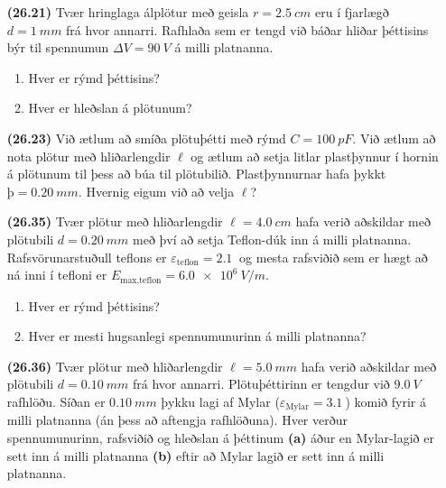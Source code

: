 \begin{enumerate}[label = \textbf{(\alph*)}]

\item[\textbf{(26.21)}] Tvær hringlaga álplötur með geisla $r = \SI{2.5}{cm}$ eru í fjarlægð $d = \SI{1}{mm}$ frá hvor annarri. Rafhlaða sem er tengd við báðar hliðar þéttisins býr til spennumun $\Delta V = \SI{90}{V}$ á milli platnanna.

\begin{enumerate}[label = \textbf{(\alph*)}]
    \item Hver er rýmd þéttisins?
    \item Hver er hleðslan á plötunum?
\end{enumerate}

\item[\textbf{(26.23)}] Við ætlum að smíða plötuþétti með rýmd $C = \SI{100}{pF}$. Við ætlum að nota plötur með hliðarlengdir $\ell$ og ætlum að setja litlar plastþynnur í hornin á plötunum til þess að búa til plötubilið. Plastþynnurnar hafa þykkt $þ = \SI{0.20}{mm}$. Hvernig eigum við að velja $\ell$?

\item[\textbf{(26.35)}] Tvær plötur með hliðarlengdir $\ell = \SI{4.0}{cm}$ hafa verið aðskildar með plötubili $d = \SI{0.20}{mm}$ með því að setja Teflon-dúk inn á milli platnanna. Rafsvörunarstuðull teflons er $\varepsilon_{\text{teflon}} = \SI{2.1}{}$ og mesta rafsviðið sem er hægt að ná inni í tefloni er $E_{\text{max,teflon}} = \SI{6.0e6}{V/m}$.
\begin{enumerate}[label = \textbf{(\alph*)}]
    \item Hver er rýmd þéttisins?
    \item Hver er mesti hugsanlegi spennumunurinn á milli platnanna?
\end{enumerate}

\item[\textbf{(26.36)}] Tvær plötur með hliðarlengdir $\ell = \SI{5.0}{mm}$ hafa verið aðskildar með plötubili $d = \SI{0.10}{mm}$ frá hvor annarri. Plötuþéttirinn er tengdur við $\SI{9.0}{V}$ rafhlöðu. Síðan er $\SI{0.10}{mm}$ þykku lagi af Mylar ($\varepsilon_{\text{Mylar}} = \SI{3.1}{}$) komið fyrir á milli platnanna (án þess að aftengja rafhlöðuna). Hver verður spennumunurinn, rafsviðið og hleðslan á þéttinum \textbf{(a)} áður en Mylar-lagið er sett inn á milli platnanna \textbf{(b)} eftir að Mylar lagið er sett inn á milli platnanna.
\end{enumerate}


